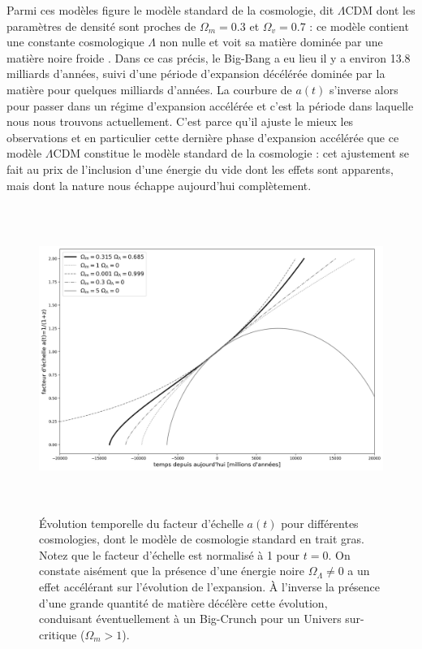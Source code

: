 Parmi ces modèles figure le modèle standard de la cosmologie, dit $\Lambda$CDM dont les paramètres de densité sont proches de $\Omega_m=0.3$ et $\Omega_v=0.7$ : ce modèle contient une constante cosmologique $\Lambda$ non nulle et voit sa matière dominée par une matière noire froide .  Dans ce cas précis, le Big-Bang a eu lieu il y a environ 13.8 milliards d'années, suivi d'une période d’expansion décélérée dominée par la matière pour quelques milliards d'années. La courbure de $a(t)$ s'inverse alors pour passer dans un régime d'expansion accélérée et c'est la période dans laquelle nous nous trouvons actuellement.  C'est parce qu'il ajuste le mieux les observations et en particulier cette dernière phase d'expansion accélérée que ce modèle $\Lambda$CDM constitue le modèle standard de la cosmologie : cet ajustement se fait au prix de l'inclusion d'une énergie du vide dont les effets sont apparents, mais dont la nature nous échappe aujourd'hui complètement.

\begin{figure}[htbp]
	\centering
		\includegraphics[height=10cm]{figs/a2t_cosmo.png}
	\caption[Facteur d'échelle pour différentes cosmologies]{Évolution temporelle du facteur d'échelle $a(t)$ pour différentes cosmologies, dont le modèle de cosmologie standard en trait gras. Notez que le facteur d'échelle est normalisé à 1 pour $t=0$. On constate aisément que la présence d'une énergie noire $\Omega_\Lambda \ne 0$ a un effet accélérant sur l'évolution de l'expansion. À l'inverse la présence d'une grande quantité de matière décélère cette évolution, conduisant éventuellement à un Big-Crunch pour un Univers sur-critique ($\Omega_m>1$).}
	\label{f:aexpcosmo}
\end{figure}

